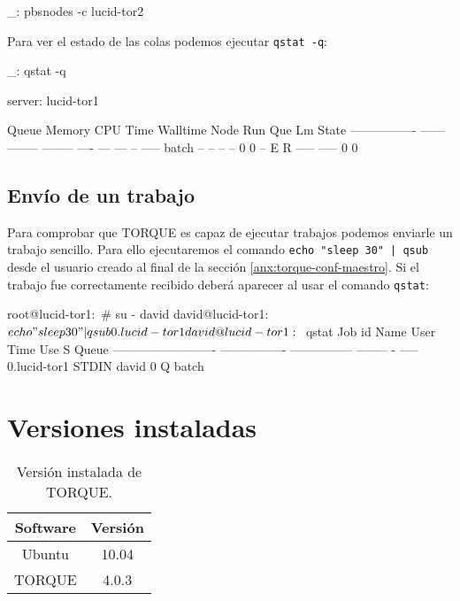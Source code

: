 \begin{bashcode}
_: pbsnodes -c lucid-tor2
\end{bashcode}

Para ver el estado de las colas podemos ejecutar \texttt{qstat -q}:

\begin{bashcode}
_: qstat -q

server: lucid-tor1

Queue            Memory CPU Time Walltime Node  Run Que Lm  State
---------------- ------ -------- -------- ----  --- --- --  -----
batch              --      --       --      --    0   0 --   E R
                                               ----- -----
                                                   0     0
\end{bashcode}


\subsection{Envío de un trabajo}

Para comprobar que TORQUE es capaz de ejecutar trabajos podemos enviarle un trabajo sencillo. Para ello ejecutaremos el comando \texttt{echo "sleep 30" | qsub} desde el usuario creado al final de la sección \ref{anx:torque-conf-maestro}. Si el trabajo fue correctamente recibido deberá aparecer al usar el comando \texttt{qstat}:

\begin{bashcode}
root@lucid-tor1:~# su - david
david@lucid-tor1:~$ echo "sleep 30" | qsub
0.lucid-tor1
david@lucid-tor1:~$ qstat
Job id                    Name             User            Time Use S Queue
------------------------- ---------------- --------------- -------- - -----
0.lucid-tor1              STDIN            david                  0 Q batch
\end{bashcode}


\section{Versiones instaladas}

\begin{table}[!htbp]
\centering
   \begin{tabular}{|c|c|}
      \hline
      \textbf{Software} & \textbf{Versión} \\ \hline
      Ubuntu & 10.04 \\ \hline
      TORQUE & 4.0.3 \\ \hline
   \end{tabular}
\caption{Versión instalada de TORQUE.}
\label{table:torque-versions}
\end{table}
